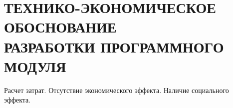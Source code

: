 \section[Технико-экономическое обоснование]{%
  ТЕХНИКО-ЭКОНОМИЧЕСКОЕ ОБОСНОВАНИЕ \\
  РАЗРАБОТКИ ПРОГРАММНОГО МОДУЛЯ
}\label{sec:teo}

Расчет затрат. Отсутствие экономического эффекта. Наличие социального эффекта.
